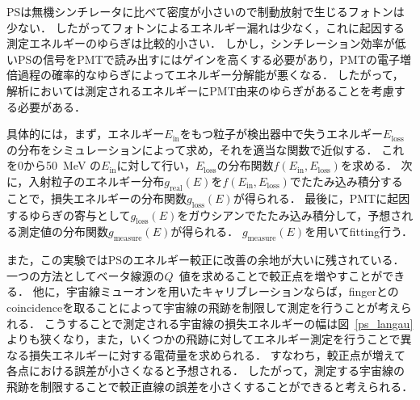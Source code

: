   PSは無機シンチレータに比べて密度が小さいので制動放射で生じるフォトンは少ない．
  したがってフォトンによるエネルギー漏れは少なく，これに起因する測定エネルギーのゆらぎは比較的小さい．
  しかし，シンチレーション効率が低いPSの信号をPMTで読み出すにはゲインを高くする必要があり，PMTの電子増倍過程の確率的なゆらぎによってエネルギー分解能が悪くなる．
  したがって，解析においては測定されるエネルギーにPMT由来のゆらぎがあることを考慮する必要がある．

  具体的には，まず，エネルギー$E_\mathrm{in}$をもつ粒子が検出器中で失うエネルギー$E_\mathrm{loss}$の分布をシミュレーションによって求め，それを適当な関数で近似する．
  これを0から50~MeV の$E_\mathrm{in}$に対して行い，$E_\mathrm{loss}$の分布関数$f(E_\mathrm{in},E_\mathrm{loss})$を求める．
  次に，入射粒子のエネルギー分布$g_{\mathrm{real}}(E)$を$f(E_\mathrm{in},E_\mathrm{loss})$でたたみ込み積分することで，損失エネルギーの分布関数$g_{\mathrm{loss}}(E)$が得られる．
  最後に，PMTに起因するゆらぎの寄与として$g_{\mathrm{loss}}(E)$をガウシアンでたたみ込み積分して，予想される測定値の分布関数$g_{\mathrm{measure}}(E)$が得られる．
  $g_{\mathrm{measure}}(E)$を用いてfitting行う．
  
  また，この実験ではPSのエネルギー較正に改善の余地が大いに残されている．
  一つの方法としてベータ線源の$Q$~値を求めることで較正点を増やすことができる．
  他に，宇宙線ミューオンを用いたキャリブレーションならば，fingerとのcoincidenceを取ることによって宇宙線の飛跡を制限して測定を行うことが考えられる．
  こうすることで測定される宇宙線の損失エネルギーの幅は図~\ref{ps_langau}よりも狭くなり，また，いくつかの飛跡に対してエネルギー測定を行うことで異なる損失エネルギーに対する電荷量を求められる．
  すなわち，較正点が増えて各点における誤差が小さくなると予想される．
  したがって，測定する宇宙線の飛跡を制限することで較正直線の誤差を小さくすることができると考えられる．

